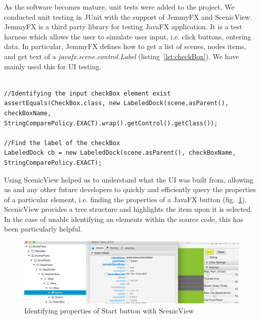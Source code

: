 As the software becomes mature, unit tests were added to the project. We conducted unit testing in JUnit with the support of JemmyFX and ScenicView. JemmyFX is a third party library for testing JavaFX application. It is a test harness which allows the user to simulate user input, i.e. click buttons, entering data. In particular, JemmyFX defines how to get a list of scenes, nodes items, and get text of a \textit{javafx.scene.control.Label} (listing~\ref{lst:checkBox}). We have mainly used this for UI testing. 


\begin{minipage}{0.9\textwidth}
	\begin{lstlisting}[caption={Use JemmyFX syntax to find a checkBox element}, label={lst:checkBox}]

//Identifying the input checkBox element exist
assertEquals(CheckBox.class, new LabeledDock(scene.asParent(), checkBoxName, StringComparePolicy.EXACT).wrap().getControl().getClass());

//Find the label of the checkBox 
LabeledDock cb = new LabeledDock(scene.asParent(), checkBoxName, StringComparePolicy.EXACT);

	\end{lstlisting}
\end{minipage}

Using ScenicView helped us to understand what the UI was built from, allowing us and any other future developers to quickly and efficiently query the properties of a particular element, i.e. finding the properties of a JavaFX button (fig.~\ref{fig:scenicview}). ScenicView provides a tree structure and highlights the item upon it is selected. In the case of unable identifying an elements within the source code, this has been particularly helpful.  
\begin{figure}[h]
	\begin{center}
		\includegraphics[width=\textwidth]{img/scenicView.png}
		\caption[Identifying properties of Start button with ScenicView]{Identifying properties of Start button with ScenicView}
		\label{fig:scenicview}
	\end{center}
\end{figure}

